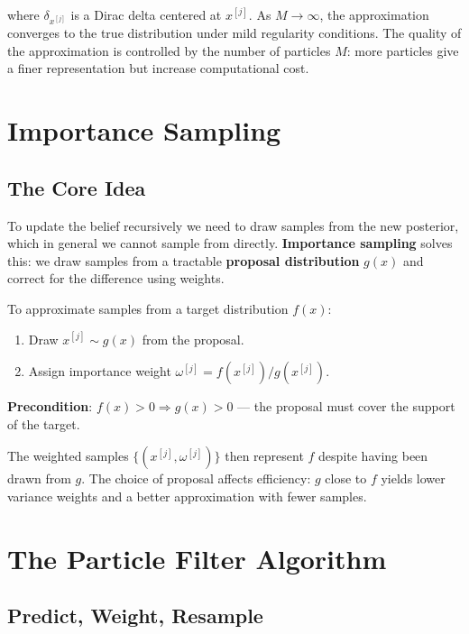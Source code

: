\documentclass[11pt,a4paper]{article}
\theoremstyle{definition}
\theoremstyle{plain}
\theoremstyle{remark}
\begin{document}
where $\delta_{x^{[j]}}$ is a Dirac delta centered at $x^{[j]}$. As $M \to \infty$, the approximation converges to the true distribution under mild regularity conditions. The quality of the approximation is controlled by the number of particles $M$: more particles give a finer representation but increase computational cost.

\section{Importance Sampling}

\subsection{The Core Idea}

To update the belief recursively we need to draw samples from the new posterior, which in general we cannot sample from directly. \textbf{Importance sampling} solves this: we draw samples from a tractable \textbf{proposal distribution} $g(x)$ and correct for the difference using weights.

\begin{tcolorbox}[colback=blue!5!white,colframe=blue!75!black,title=\textbf{Importance Sampling}]
To approximate samples from a target distribution $f(x)$:
\begin{enumerate}
    \item Draw $x^{[j]} \sim g(x)$ from the proposal.
    \item Assign importance weight $\omega^{[j]} = f(x^{[j]})/g(x^{[j]})$.
\end{enumerate}
\textbf{Precondition}: $f(x) > 0 \Rightarrow g(x) > 0$ — the proposal must cover the support of the target.
\end{tcolorbox}

The weighted samples $\{(x^{[j]}, \omega^{[j]})\}$ then represent $f$ despite having been drawn from $g$. The choice of proposal affects efficiency: $g$ close to $f$ yields lower variance weights and a better approximation with fewer samples.

\section{The Particle Filter Algorithm}

\subsection{Predict, Weight, Resample}
\end{document}

